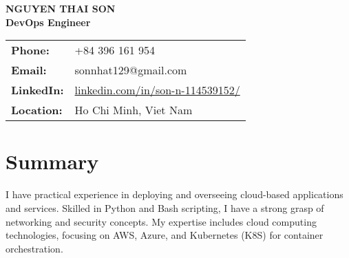 \documentclass[a4paper,10pt]{article}
\begin{document}
\begin{center}
    {\Huge \textbf{NGUYEN THAI SON}} \\
    \vspace{6pt}
    \textbf{DevOps Engineer} \\
    \vspace{6pt}
    \begin{tabular}{ll}
        \textbf{Phone:} & +84 396 161 954 \\
        \textbf{Email:} & sonnhat129@gmail.com \\
        \textbf{LinkedIn:} & \href{https://www.linkedin.com/in/son-n-114539152/}{linkedin.com/in/son-n-114539152/} \\
        \textbf{Location:} & Ho Chi Minh, Viet Nam \\
    \end{tabular}
\end{center}

\vspace{10pt}
\section*{Summary}
I have practical experience in deploying and overseeing cloud-based applications and services. Skilled in Python and Bash scripting, I have a strong grasp of networking and security concepts. My expertise includes cloud computing technologies, focusing on AWS, Azure, and Kubernetes (K8S) for container orchestration.

\vspace{5pt}
\end{document}
